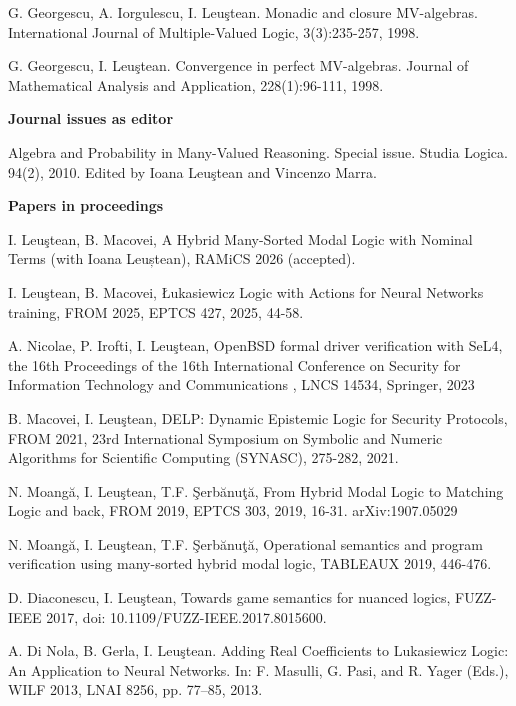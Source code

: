 \documentclass[11pt]{article}
\begin{document}
\noindent
[J2] G. Georgescu, A. Iorgulescu, I. Leu\c stean. Monadic and closure MV-algebras. International Journal of Multiple-Valued Logic, 3(3):235-257, 1998.

\noindent
[J1] G. Georgescu, I. Leu\c stean. Convergence in perfect MV-algebras. Journal of Mathematical Analysis and Application, 228(1):96-111, 1998.


\vspace{.3cm}
\noindent
{\large \textbf{Journal issues as editor}}

\noindent
[JI1]  Algebra and Probability in Many-Valued Reasoning.
    Special issue. Studia Logica. 94(2), 2010. Edited by Ioana Leu\c stean and Vincenzo Marra. 

\newpage

\vspace{0.3cm}
\noindent
{\large \textbf{Papers in  proceedings}}

\noindent
[P13] I. Leu\c stean, B. Macovei, A Hybrid Many-Sorted Modal Logic with Nominal Terms (with Ioana Leuștean), RAMiCS 2026 (accepted).

\noindent
[P12] I. Leu\c stean, B. Macovei, Łukasiewicz Logic with Actions for Neural Networks training, FROM 2025,  EPTCS 427, 2025, 44-58. 

\noindent 
[P11] A. Nicolae, P. Irofti, I. Leu\c stean, OpenBSD formal driver verification with SeL4, the 16th
Proceedings of the 16th International Conference on Security for Information Technology
and Communications , LNCS 14534, Springer, 2023

\noindent
[P10] B. Macovei,  I. Leu\c stean, DELP: Dynamic Epistemic Logic for Security Protocols, FROM 2021,  23rd International Symposium on Symbolic and Numeric Algorithms for Scientific Computing (SYNASC), 275-282, 2021.

\noindent
[P9] N.  Moangă, I. Leu\c stean, T.F. Şerbănuţă,  From Hybrid Modal Logic to Matching Logic and back, FROM 2019, EPTCS 303, 2019, 16-31. arXiv:1907.05029

\noindent
[P8] N.  Moangă, I. Leu\c stean, T.F. Şerbănuţă,  Operational semantics and program verification using many-sorted hybrid modal logic, TABLEAUX 2019, 446-476. 

\noindent
[P7] D. Diaconescu, I. Leu\c stean, Towards game semantics for nuanced logics, FUZZ-IEEE 2017, doi: 10.1109/FUZZ-IEEE.2017.8015600. 

\noindent 
[P6] A. Di Nola, B. Gerla, I. Leu\c stean. Adding Real Coefficients to Lukasiewicz Logic: An Application to Neural Networks. In:
 F. Masulli, G. Pasi, and R. Yager (Eds.), WILF 2013, LNAI 8256, pp. 77–85, 2013.
\end{document}
